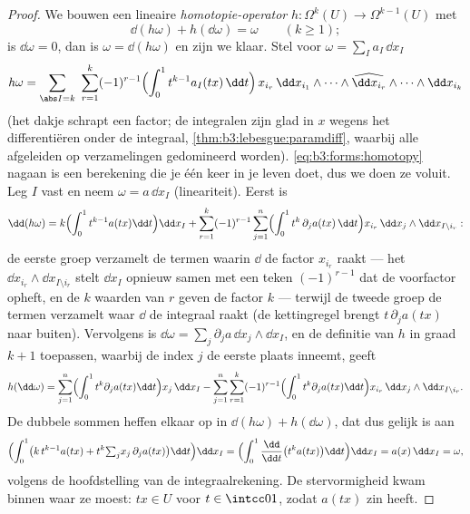 \begin{proof}
We bouwen een lineaire \emph{homotopie-operator} $h\colon
\Omega^k(U) \to \Omega^{k-1}(U)$ met
\begin{equation}\label{eq:b3:forms:homotopy}
\dd(h\omega) + h(\dd\omega) = \omega
\qquad (k \geq 1);
\end{equation}
is $\dd\omega = 0$, dan is $\omega = \dd(h\omega)$ en zijn we
klaar. Stel voor $\omega = \sum_I a_I\,\dd x_I$
\[
h\omega = \sum_{\abs I = k}\ \sum_{r=1}^{k}(-1)^{r-1}
\Bigl(\int_0^1 t^{k-1}a_I(tx)\,\dd t\Bigr)\,
x_{i_r}\,\dd x_{i_1}\wedge\dots\wedge
\widehat{\dd x_{i_r}}\wedge\dots\wedge\dd x_{i_k}
\]
(het dakje schrapt een factor; de integralen zijn glad in $x$
wegens het differentiëren onder de integraal,
\cref{thm:b3:lebesgue:paramdiff}, waarbij alle afgeleiden op
 verzamelingen gedomineerd worden).
\eqref{eq:b3:forms:homotopy} nagaan is een berekening die je één
keer in je leven doet, dus we doen ze voluit. Leg $I$ vast en
neem $\omega = a\,\dd x_I$ (lineariteit). Eerst is
\[
\dd(h\omega) = k\Bigl(\int_0^1t^{k-1}a(tx)\dd t\Bigr)\dd x_I
+ \sum_{r=1}^k(-1)^{r-1}\sum_{j=1}^n
\Bigl(\int_0^1t^{k}\,\partial_ja(tx)\,\dd t\Bigr)
x_{i_r}\,\dd x_j\wedge\dd x_{I\setminus i_r} :
\]
de eerste groep verzamelt de termen waarin $\dd$ de factor
$x_{i_r}$ raakt --- het  $\dd x_{i_r}\wedge\dd
x_{I\setminus i_r}$ stelt $\dd x_I$ opnieuw samen met een teken
$(-1)^{r-1}$ dat de voorfactor opheft, en de $k$ waarden van $r$
geven de factor $k$ --- terwijl de tweede groep de termen
verzamelt waar $\dd$ de integraal raakt (de kettingregel brengt
$t\,\partial_ja(tx)$ naar buiten). Vervolgens is $\dd\omega =
\sum_j\partial_ja\,\dd x_j\wedge\dd x_I$, en de definitie van $h$
in graad $k+1$ toepassen, waarbij de index $j$ de eerste plaats
inneemt, geeft
\[
h(\dd\omega) = \sum_{j=1}^n\Bigl(\int_0^1t^{k}
\partial_ja(tx)\dd t\Bigr)x_j\,\dd x_I
- \sum_{j=1}^n\sum_{r=1}^k(-1)^{r-1}
\Bigl(\int_0^1t^{k}\partial_ja(tx)\dd t\Bigr)
x_{i_r}\,\dd x_j\wedge\dd x_{I\setminus i_r} .
\]
De dubbele sommen heffen elkaar op in $\dd(h\omega) +
h(\dd\omega)$, dat dus gelijk is aan
\[
\Bigl(\int_0^1\bigl(k\,t^{k-1}a(tx) +
t^k{\textstyle\sum_j}x_j\,\partial_ja(tx)\bigr)\dd t\Bigr)
\dd x_I
= \Bigl(\int_0^1\frac{\dd}{\dd t}\bigl(t^ka(tx)\bigr)\dd
t\Bigr)\dd x_I
= a(x)\,\dd x_I = \omega,
\]
volgens de hoofdstelling van de integraalrekening. De
stervormigheid kwam binnen waar ze moest: $tx \in U$ voor $t \in
\intcc01$, zodat $a(tx)$ zin heeft.
\end{proof}

